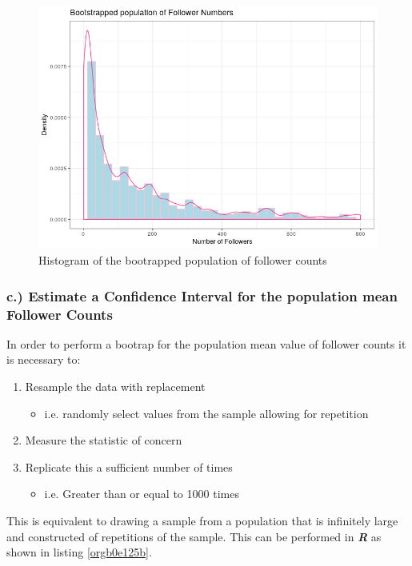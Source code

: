 \documentclass[11pt]{article}
\begin{document}
\begin{figure}[htbp]
\centering
\includegraphics[width=12cm]{./Figures/BootStrap_Pop.png}
\caption{\label{fig:org100a61e}Histogram of the bootrapped population of follower counts}
\end{figure}

\subsubsection{c.) Estimate a Confidence Interval for the population mean Follower Counts}
\label{sec:orga3d2e45}
In order to perform a bootrap for the population mean value of follower counts it is necessary to:

\begin{enumerate}
\item Resample the data with replacement
\begin{itemize}
\item i.e. randomly select values from the sample allowing for repetition
\end{itemize}
\item Measure the statistic of concern
\item Replicate this a sufficient number of times
\begin{itemize}
\item i.e. Greater than or equal to 1000 times \cite[Ch. 5]{davison1997}
\end{itemize}
\end{enumerate}

This is equivalent to drawing a sample from a population that is infinitely large and constructed of repetitions of the sample. This can be performed in \textbf{\emph{R}} as shown in listing \ref{orgb0e125b}.
\end{document}
